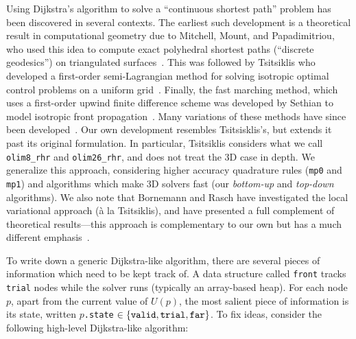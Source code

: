 \documentclass[smallcondensed]{svjour3}
\begin{document}
Using Dijkstra's algorithm to solve a ``continuous shortest path''
problem has been discovered in several contexts. The earliest such
development is a theoretical result in computational geometry due to
Mitchell, Mount, and Papadimitriou, who used this idea to compute
exact polyhedral shortest paths (``discrete geodesics'') on
triangulated surfaces~\cite{mitchell1987discrete}. This was followed
by Tsitsiklis who developed a first-order semi-Lagrangian method for
solving isotropic optimal control problems on a uniform
grid~\cite{tsitsiklis1995efficient}. Finally, the fast marching
method, which uses a first-order upwind finite difference scheme was
developed by Sethian to model isotropic front
propagation~\cite{sethian1996fast}. Many variations of these methods
have since been
developed~\cite{sethian2003ordered,kao2008legendre}. Our own
development resembles Tsitsisklis's, but extends it past its original
formulation. In particular, Tsitsiklis considers what we call
\texttt{olim8\_rhr} and \texttt{olim26\_rhr}, and does not treat the
3D case in depth. We generalize this approach, considering higher
accuracy quadrature rules (\texttt{mp0} and \texttt{mp1}) and
algorithms which make 3D solvers fast (our \emph{bottom-up} and
\emph{top-down} algorithms). We also note that Bornemann and Rasch
have investigated the local variational approach (\`{a} la
Tsitsiklis), and have presented a full complement of theoretical
results---this approach is complementary to our own but has a much
different emphasis~\cite{bornemann2006finite}.

To write down a generic Dijkstra-like algorithm, there are several
pieces of information which need to be kept track of. A data structure
called \texttt{front} tracks \texttt{trial} nodes while the solver
runs (typically an array-based heap). For each node $p$, apart from
the current value of $U(p)$, the most salient piece of information is
its state, written $p$\texttt{.state}
$\in \left\{\texttt{valid}, \texttt{trial}, \texttt{far}\right\}$. To fix
ideas, consider the following high-level Dijkstra-like algorithm:
\end{document}
